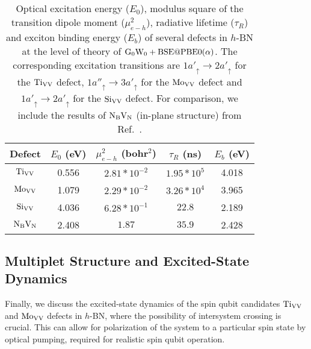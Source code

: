 \begin{table}[H]
    \footnotesize
    \centering

\begin{tabular}{c c c c c}
    \hline \hline
        Defect    &   $E_{0}$ (eV)    &   $\mu^2_{e-h}$ (bohr$^2$)   &    $\tau_R$ (ns)   &   $E_{b}$ (eV)\\
    \hline
         $\text{Ti}_{\text{V}\text{V}}$    &       0.556       &        $2.81*10^{-2}$        &    $1.95*10^{5}$   &   4.018\\
         $\text{Mo}_{\text{V}\text{V}}$    &       1.079       &        $2.29*10^{-2}$        &    $3.26*10^{4}$   &   3.965\\
         $\text{Si}_{\text{V}\text{V}}$   &       4.036       &        $6.28*10^{-1}$        &    $22.8$          &   2.189\\
        $\text{N}_\text{B}\text{V}_\text{N}$   &       2.408       &        $1.87$                &    $35.9$          &   2.428\\
    \hline \hline
\end{tabular}

    \caption{
Optical excitation energy ($E_{0}$), modulus square of the transition dipole moment ($\mu^2_{e-h}$), radiative lifetime ($\tau_R$) and exciton binding energy ($E_b$) of several defects in $h$-BN at the level of theory of $\text{G}_0\text{W}_0+\text{BSE}@\text{PBE0($\mathrm{\alpha}$)}$. The corresponding excitation transitions are $1a'_\uparrow \rightarrow 2a'_\uparrow$ for the $\text{Ti}_{\text{V}\text{V}}$ defect, $1a''_\uparrow \rightarrow 3a'_\uparrow$ for the $\text{Mo}_{\text{V}\text{V}}$ defect and $1a'_\uparrow \rightarrow 2a'_\uparrow$ for the $\text{Si}_{\text{V}\text{V}}$ defect. For comparison, we include the results of $\text{N}_\text{B}\text{V}_\text{N}$ (in-plane structure) from Ref.~\cite{wu2019carrier}.
    }
    \label{table:rad}
\end{table}



\subsection{Multiplet Structure and Excited-State Dynamics}
Finally, we discuss the excited-state dynamics of the spin qubit candidates $\text{Ti}_{\text{V}\text{V}}$ and $\text{Mo}_{\text{V}\text{V}}$ defects in $h$-BN, where the possibility of intersystem crossing is crucial.
This can allow for polarization of the system to a particular spin state by optical pumping, required for realistic spin qubit operation.

